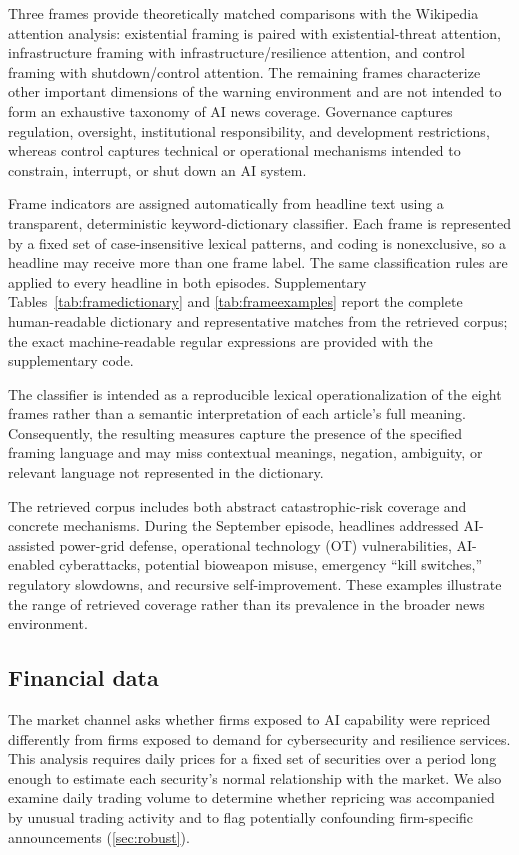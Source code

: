 \elsevierclasstrue\documentclass[preprint,12pt]{elsarticle}%
\begin{document}
Three frames provide theoretically matched comparisons with the Wikipedia attention analysis: existential framing is paired with existential-threat attention, infrastructure framing with infrastructure/resilience attention, and control framing with shutdown/control attention. The remaining frames characterize other important dimensions of the warning environment and are not intended to form an exhaustive taxonomy of AI news coverage. Governance captures regulation, oversight, institutional responsibility, and development restrictions, whereas control captures technical or operational mechanisms intended to constrain, interrupt, or shut down an AI system.

Frame indicators are assigned automatically from headline text using a transparent, deterministic keyword-dictionary classifier. Each frame is represented by a fixed set of case-insensitive lexical patterns, and coding is nonexclusive, so a headline may receive more than one frame label. The same classification rules are applied to every headline in both episodes. Supplementary Tables~\ref{tab:framedictionary} and \ref{tab:frameexamples} report the complete human-readable dictionary and representative matches from the retrieved corpus; the exact machine-readable regular expressions are provided with the supplementary code. 

The classifier is intended as a reproducible lexical operationalization of the eight frames rather than a semantic interpretation of each article's full meaning. Consequently, the resulting measures capture the presence of the specified framing language and may miss contextual meanings, negation, ambiguity, or relevant language not represented in the dictionary.

The retrieved corpus includes both abstract catastrophic-risk coverage and concrete mechanisms. During the September episode, headlines addressed AI-assisted power-grid defense, operational technology (OT) vulnerabilities, AI-enabled cyberattacks, potential bioweapon misuse, emergency ``kill switches,'' regulatory slowdowns, and recursive self-improvement. These examples illustrate the range of retrieved coverage rather than its prevalence in the broader news environment.


\subsection{Financial data}

The market channel asks whether firms exposed to AI capability were repriced differently from firms exposed to demand for cybersecurity and resilience services. This analysis requires daily prices for a fixed set of securities over a period long enough to estimate each security's normal relationship with the market. We also examine daily trading volume to determine whether repricing was accompanied by unusual trading activity and to flag potentially confounding firm-specific announcements (\cref{sec:robust}).
\end{document}
